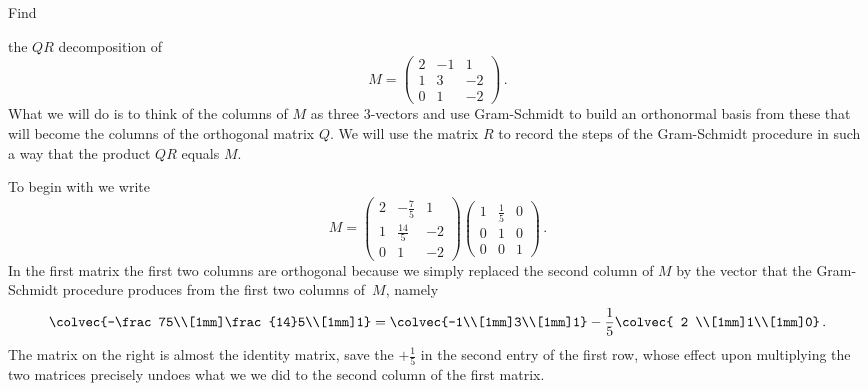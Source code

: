 \begin{example}
\hypertarget{methodQR}{Find} the $QR$ decomposition of \[M=\begin{pmatrix}2&-1&1\\1&3&-2\\0&1&-2\end{pmatrix}\, .\]
What we will do is to think of the columns of $M$ as three 3-vectors and use Gram-Schmidt to
build an orthonormal basis from these that will become the columns of the orthogonal matrix $Q$.
We will use the matrix $R$ to record the steps of the Gram-Schmidt procedure in such a way
that the product $QR$ equals $M$. 

To begin with we write
\[
M=\begin{pmatrix}2&-\frac75&1\\[1mm]1&\frac{14}5&-2\\[1mm]0&1&-2\end{pmatrix}
\begin{pmatrix}1&\frac15&0\\[1mm]0&1&0\\[1mm]0&0&1\end{pmatrix}\, .
\]
In the first matrix the first two columns are  orthogonal because we simply replaced the second column of $M$ by the vector that the Gram-Schmidt
procedure produces from the first two columns of~$M$, namely
\[
\colvec{-\frac75\\[1mm]\frac{14}5\\[1mm]1}=\colvec{-1\\[1mm]3\\[1mm]1}-\frac15
\colvec{ 2 \\[1mm]1\\[1mm]0}\, .
\]
 The matrix on the right is almost the identity
matrix, save the $+\frac15$ in the second entry of the first row, whose effect upon multiplying the
two matrices precisely undoes what we we did to the second column of the first matrix. 


\end{example}
